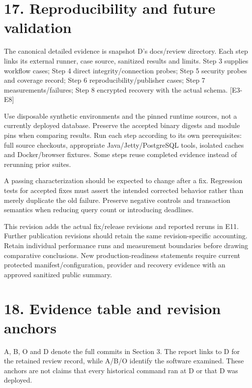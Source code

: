 \documentclass[11pt,a4paper]{article}
\begin{document}
\section*{17. Reproducibility and future validation}

The canonical detailed evidence is snapshot D's docs/\allowbreak{}review directory. Each step links its external runner, case source, sanitized results and limits. Step 3 supplies workflow cases; Step 4 direct integrity/\allowbreak{}connection probes; Step 5 security probes and coverage record; Step 6 reproducibility/\allowbreak{}publisher cases; Step 7 measurements/\allowbreak{}failures; Step 8 encrypted recovery with the actual schema. [E3-E8]

Use disposable synthetic environments and the pinned runtime sources, not a currently deployed database. Preserve the accepted binary digests and module pins when comparing results. Run each step according to its own prerequisites: full source checkouts, appropriate Java/\allowbreak{}Jetty/\allowbreak{}PostgreSQL tools, isolated caches and Docker/\allowbreak{}browser fixtures. Some steps reuse completed evidence instead of rerunning prior suites.

A passing characterization should be expected to change after a fix. Regression tests for accepted fixes must assert the intended corrected behavior rather than merely duplicate the old failure. Preserve negative controls and transaction semantics when reducing query count or introducing deadlines.

This revision adds the actual fix/\allowbreak{}release revisions and reported reruns in E11. Further publication revisions should retain the same revision-specific accounting. Retain individual performance runs and measurement boundaries before drawing comparative conclusions. New production-readiness statements require current protected manifest/\allowbreak{}configuration, provider and recovery evidence with an approved sanitized public summary.

\clearpage
\section*{18. Evidence table and revision anchors}

A, B, O and D denote the full commits in Section 3. The report links to D for the retained review record, while A/\allowbreak{}B/\allowbreak{}O identify the software examined. These anchors are not claims that every historical command ran at D or that D was deployed.
\end{document}
